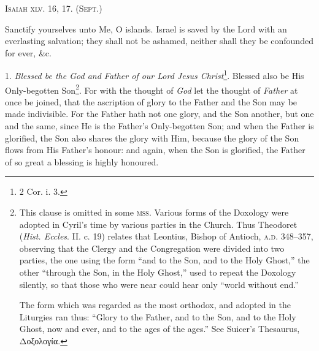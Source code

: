 \textsc{Isaiah xlv. 16, 17}\textsc{. (Sept.)}

Sanctify yourselves unto Me, O islands. Israel is saved by the Lord with an everlasting salvation; they shall not be ashamed, neither shall they be confounded for ever, \&c.

1. \emph{Blessed be the God and Father of our Lord Jesus Christ}\footnote{2 Cor. i. 3.}. Blessed also be His Only-begotten Son\footnote{This clause is omitted in some \textsc{mss.} Various forms of the Doxology were adopted in Cyril’s time by various parties in the Church. Thus Theodoret (\emph{Hist. Eccles}. II. c. 19) relates that Leontius, Bishop of Antioch, \textsc{a.d.} 348–357, observing that the Clergy and the Congregation were divided into two parties, the one using the form “and to the Son, and to the Holy Ghost,” the other “through the Son, in the Holy Ghost,” used to repeat the Doxology silently, so that those who were near could hear only “world without end.” \par The form which was regarded as the most orthodox, and adopted in the Liturgies ran thus: “Glory to the Father, and to the Son, and to the Holy Ghost, now and ever, and to the ages of the ages.” See Suicer’s Thesaurus, \textgreek{Δοξολογία}.}. For with the thought of \emph{God} let the thought of \emph{Father} at once be joined, that the ascription of glory to the Father and the Son may be made indivisible. For the Father hath not one glory, and the Son another, but one and the same, since He is the Father’s Only-begotten Son; and when the Father is glorified, the Son also shares the glory with Him, because the glory of the Son flows from His Father’s honour: and again, when the Son is glorified, the Father of so great a blessing is highly honoured.

